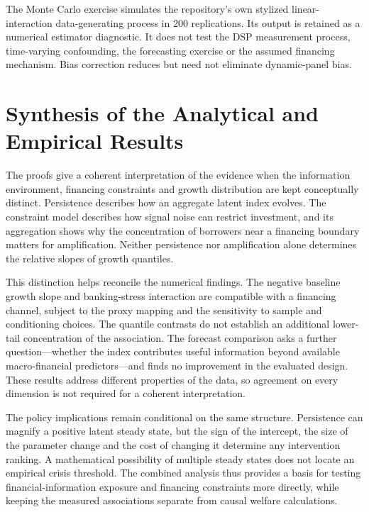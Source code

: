 The Monte Carlo exercise simulates the repository's own stylized
linear-interaction data-generating process in 200 replications. Its output
is retained as a numerical estimator diagnostic. It does not test the DSP
measurement process, time-varying confounding, the forecasting
exercise or the assumed financing mechanism. Bias correction reduces but
need not eliminate dynamic-panel bias.

\clearpage
\section{Synthesis of the Analytical and Empirical Results}\label{app:synthesis}
The proofs give a coherent interpretation of the evidence when the
information environment, financing constraints and growth distribution are
kept conceptually distinct. Persistence describes how an aggregate latent
index evolves. The constraint model describes how signal noise can restrict
investment, and its aggregation shows why the concentration of borrowers
near a financing boundary matters for amplification. Neither persistence nor
amplification alone determines the relative slopes of growth quantiles.

This distinction helps reconcile the numerical findings. The negative
baseline growth slope and banking-stress interaction are compatible with a
financing channel, subject to the proxy mapping and the sensitivity to sample
and conditioning choices. The quantile contrasts do not establish an
additional lower-tail concentration of the association. The forecast
comparison asks a further question---whether the index contributes useful
information beyond available macro-financial predictors---and finds no
improvement in the evaluated design. These results address different
properties of the data, so agreement on every dimension is not required for
a coherent interpretation.

The policy implications remain conditional on the same structure. Persistence
can magnify a positive latent steady state, but the sign of the intercept,
the size of the parameter change and the cost of changing it determine any
intervention ranking. A mathematical possibility of multiple steady states
does not locate an empirical crisis threshold. The combined analysis thus
provides a basis for testing financial-information exposure and financing
constraints more directly, while keeping the measured associations separate
from causal welfare calculations.
